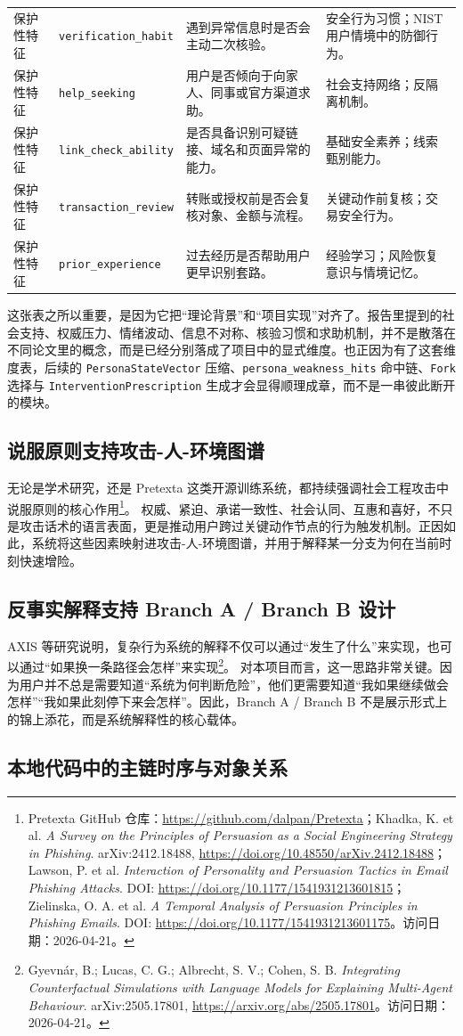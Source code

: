 \documentclass[12pt,a4paper]{ctexart}
\newcommand{\ResearchDate}{2026-04-21}
\newcommand{\SrcPersuasion}{\footnote{Pretexta GitHub 仓库：\url{https://github.com/dalpan/Pretexta}；Khadka, K. et al. \emph{A Survey on the Principles of Persuasion as a Social Engineering Strategy in Phishing}. arXiv:2412.18488, \url{https://doi.org/10.48550/arXiv.2412.18488}；Lawson, P. et al. \emph{Interaction of Personality and Persuasion Tactics in Email Phishing Attacks}. DOI: \url{https://doi.org/10.1177/1541931213601815}；Zielinska, O. A. et al. \emph{A Temporal Analysis of Persuasion Principles in Phishing Emails}. DOI: \url{https://doi.org/10.1177/1541931213601175}。访问日期：\ResearchDate。}}
\newcommand{\SrcAxis}{\footnote{Gyevnár, B.; Lucas, C. G.; Albrecht, S. V.; Cohen, S. B. \emph{Integrating Counterfactual Simulations with Language Models for Explaining Multi-Agent Behaviour}. arXiv:2505.17801, \url{https://arxiv.org/abs/2505.17801}。访问日期：\ResearchDate。}}
\begin{document}
\begin{longtable}{p{}p{}p{}p{}}
保护性特征 & \texttt{verification\_habit} & 遇到异常信息时是否会主动二次核验。 & 安全行为习惯；NIST 用户情境中的防御行为。 \\
保护性特征 & \texttt{help\_seeking} & 用户是否倾向于向家人、同事或官方渠道求助。 & 社会支持网络；反隔离机制。 \\
保护性特征 & \texttt{link\_check\_ability} & 是否具备识别可疑链接、域名和页面异常的能力。 & 基础安全素养；线索甄别能力。 \\
保护性特征 & \texttt{transaction\_review} & 转账或授权前是否会复核对象、金额与流程。 & 关键动作前复核；交易安全行为。 \\
保护性特征 & \texttt{prior\_experience} & 过去经历是否帮助用户更早识别套路。 & 经验学习；风险恢复意识与情境记忆。 \\
\bottomrule
\end{longtable}

这张表之所以重要，是因为它把“理论背景”和“项目实现”对齐了。报告里提到的社会支持、权威压力、情绪波动、信息不对称、核验习惯和求助机制，并不是散落在不同论文里的概念，而是已经分别落成了项目中的显式维度。也正因为有了这套维度表，后续的 \texttt{PersonaStateVector} 压缩、\texttt{persona\_weakness\_hits} 命中链、\texttt{Fork} 选择与 \texttt{InterventionPrescription} 生成才会显得顺理成章，而不是一串彼此断开的模块。

\subsection{说服原则支持攻击-人-环境图谱}

无论是学术研究，还是 Pretexta 这类开源训练系统，都持续强调社会工程攻击中说服原则的核心作用\SrcPersuasion。 权威、紧迫、承诺一致性、社会认同、互惠和喜好，不只是攻击话术的语言表面，更是推动用户跨过关键动作节点的行为触发机制。正因如此，系统将这些因素映射进攻击-人-环境图谱，并用于解释某一分支为何在当前时刻快速增险。

\subsection{反事实解释支持 Branch A / Branch B 设计}

AXIS 等研究说明，复杂行为系统的解释不仅可以通过“发生了什么”来实现，也可以通过“如果换一条路径会怎样”来实现\SrcAxis。 对本项目而言，这一思路非常关键。因为用户并不总是需要知道“系统为何判断危险”，他们更需要知道“我如果继续做会怎样”“我如果此刻停下来会怎样”。因此，Branch A / Branch B 不是展示形式上的锦上添花，而是系统解释性的核心载体。

\subsection{本地代码中的主链时序与对象关系}
\end{document}
